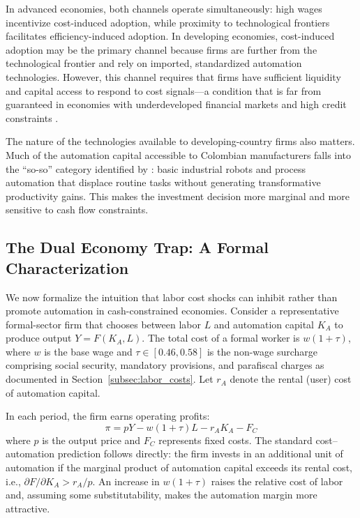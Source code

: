 \documentclass[5p,times,authoryear]{elsarticle}
\begin{document}
In advanced economies, both channels operate simultaneously: high wages incentivize cost-induced adoption, while proximity to technological frontiers facilitates efficiency-induced adoption. In developing economies, cost-induced adoption may be the primary channel because firms are further from the technological frontier and rely on imported, standardized automation technologies. However, this channel requires that firms have sufficient liquidity and capital access to respond to cost signals---a condition that is far from guaranteed in economies with underdeveloped financial markets and high credit constraints \citep{busso2020}.

The nature of the technologies available to developing-country firms also matters. Much of the automation capital accessible to Colombian manufacturers falls into the ``so-so'' category identified by \citet{acemoglu2020taxes}: basic industrial robots and process automation that displace routine tasks without generating transformative productivity gains. This makes the investment decision more marginal and more sensitive to cash flow constraints.

\subsection{The Dual Economy Trap: A Formal Characterization}
\label{subsec:formal_trap}

We now formalize the intuition that labor cost shocks can inhibit rather than promote automation in cash-constrained economies. Consider a representative formal-sector firm that chooses between labor $L$ and automation capital $K_A$ to produce output $Y = F(K_A, L)$. The total cost of a formal worker is $w(1 + \tau)$, where $w$ is the base wage and $\tau \in [0.46, 0.58]$ is the non-wage surcharge comprising social security, mandatory provisions, and parafiscal charges as documented in Section~\ref{subsec:labor_costs}. Let $r_A$ denote the rental (user) cost of automation capital.

In each period, the firm earns operating profits:
\begin{equation}
\label{eq:profits}
\pi = pY - w(1+\tau)L - r_A K_A - F_C
\end{equation}
where $p$ is the output price and $F_C$ represents fixed costs. The standard cost--automation prediction follows directly: the firm invests in an additional unit of automation if the marginal product of automation capital exceeds its rental cost, i.e., $\partial F / \partial K_A > r_A / p$. An increase in $w(1+\tau)$ raises the relative cost of labor and, assuming some substitutability, makes the automation margin more attractive.
\end{document}
